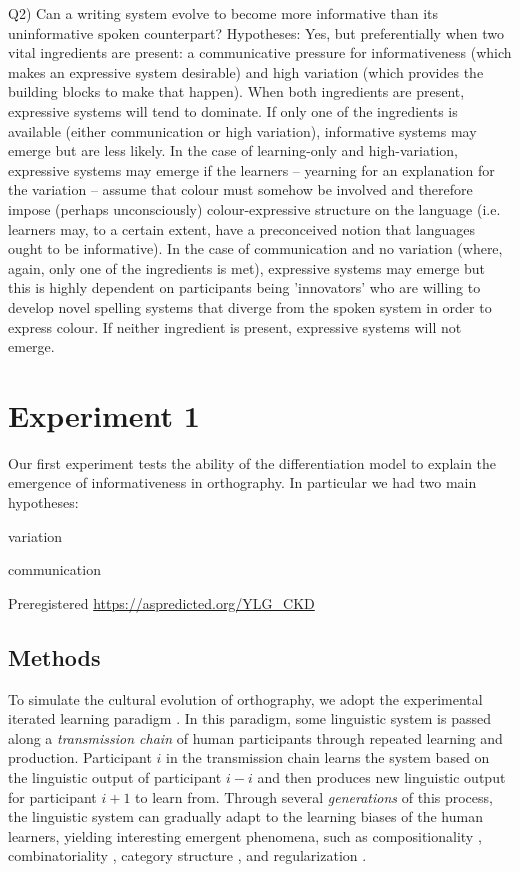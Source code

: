 \documentclass[doc,biblatex]{apa7}
\begin{document}
Q2) Can a writing system evolve to become more informative than its uninformative spoken counterpart? Hypotheses: Yes, but preferentially when two vital ingredients are present: a communicative pressure for informativeness (which makes an expressive system desirable) and high variation (which provides the building blocks to make that happen). When both ingredients are present, expressive systems will tend to dominate. If only one of the ingredients is available (either communication or high variation), informative systems may emerge but are less likely. In the case of learning-only and high-variation, expressive systems may emerge if the learners – yearning for an explanation for the variation – assume that colour must somehow be involved and therefore impose (perhaps unconsciously) colour-expressive structure on the language (i.e. learners may, to a certain extent, have a preconceived notion that languages ought to be informative). In the case of communication and no variation (where, again, only one of the ingredients is met), expressive systems may emerge but this is highly dependent on participants being 'innovators' who are willing to develop novel spelling systems that diverge from the spoken system in order to express colour. If neither ingredient is present, expressive systems will not emerge.




\section{Experiment 1}

Our first experiment tests the ability of the differentiation model to explain the emergence of informativeness in orthography. In particular we had two main hypotheses:

variation

communication

Preregistered \url{https://aspredicted.org/YLG_CKD}

\subsection{Methods}

To simulate the cultural evolution of orthography, we adopt the experimental iterated learning paradigm \parencite{Kirby:2008, Kirby:2015}. In this paradigm, some linguistic system is passed along a \textit{transmission chain} of human participants through repeated learning and production. Participant $i$ in the transmission chain learns the system based on the linguistic output of participant $i-i$ and then produces new linguistic output for participant $i+1$ to learn from. Through several \textit{generations} of this process, the linguistic system can gradually adapt to the learning biases of the human learners, yielding interesting emergent phenomena, such as compositionality \parencite{Kirby:2008, Kirby:2015}, combinatoriality \parencite{Verhoef:2015}, category structure \parencite{Carr:2017, Carr:2020}, and regularization \parencite{Smith:2010, Ferdinand:2019}.
\end{document}
